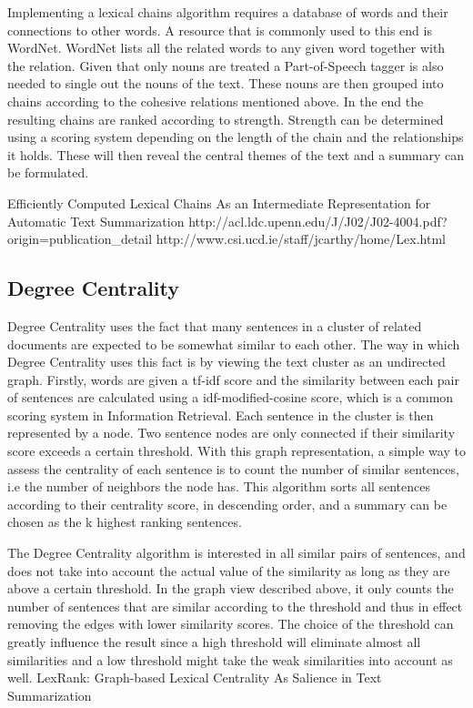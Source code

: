 \documentclass[10pt, a4paper]{article}
\begin{document}
Implementing a lexical chains algorithm requires a database of words and their connections to other words. A resource that is commonly used to this end is WordNet. WordNet lists all the related words to any given word together with the relation. Given that only nouns are treated a Part-of-Speech tagger is also needed to single out the nouns of the text. These nouns are then grouped into chains according to the cohesive relations mentioned above. In the end the resulting chains are ranked according to strength. Strength can be determined using a scoring system depending on the length of the chain and the relationships it holds. These will then reveal the central themes of the text and a summary can be formulated.

Efficiently Computed Lexical Chains As an Intermediate Representation for Automatic Text Summarization
http://acl.ldc.upenn.edu/J/J02/J02-4004.pdf?origin=publication_detail
http://www.csi.ucd.ie/staff/jcarthy/home/Lex.html

\subsection{Degree Centrality}

Degree Centrality uses the fact that many sentences in a cluster of related documents are expected to be somewhat similar to each other. The way in which Degree Centrality uses this fact is by viewing the text cluster as an undirected graph. Firstly, words are given a tf-idf score and the similarity between each pair of sentences are calculated using a idf-modified-cosine score, which is a common scoring system in Information Retrieval.  Each sentence in the cluster is then represented by a node. Two sentence nodes are only connected if their similarity score exceeds a certain threshold. With this graph representation, a simple way to assess the centrality of each sentence is to count the number of similar sentences, i.e the number of neighbors the node has. This algorithm sorts all sentences according to their centrality score, in descending order, and a summary can be chosen as the k highest ranking sentences. 

The Degree Centrality algorithm is interested in all similar pairs of sentences, and does not take into account the actual value of the similarity as long as they are above a certain threshold. In the graph view described above, it only counts the number of sentences that are similar according to the threshold and thus in effect removing the edges with lower similarity scores. The choice of the threshold can greatly influence the result since a high threshold will eliminate almost all similarities and a low threshold might take the weak similarities into account as well.
LexRank: Graph-based Lexical Centrality As Salience in Text Summarization
\end{document}
